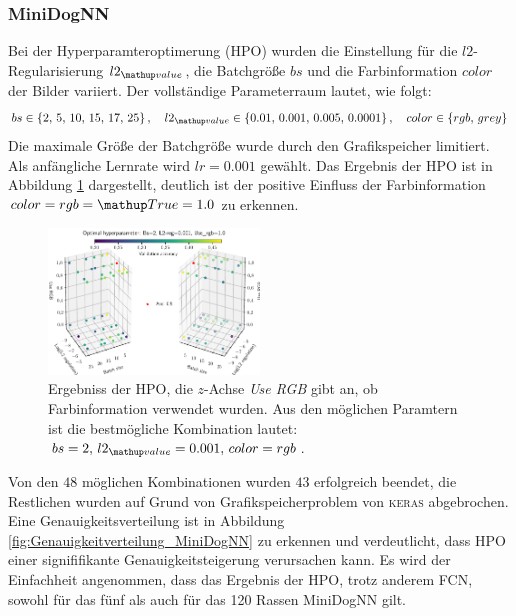 \subsubsection{MiniDogNN}
Bei der Hyperparamteroptimerung (HPO) wurden die Einstellung für die $l2$-Regularisierung $l2\ua{value}$,
die Batchgröße $bs$ und die Farbinformation $color$ der Bilder variiert. Der vollständige
Parameterraum lautet, wie folgt:
\begin{equation}
  \label{eq:Parameterraum_MiniDogNN}
  bs\in\left\{2,\, 5, \,10, \,15,\, 17,\, 25\right\}, \quad l2\ua{value}\in\left\{0.01, \,0.001,\, 0.005,\, 0.0001\right\}, \quad color\in\left\{rgb, \,grey\right\}
\end{equation}
Die maximale Größe der Batchgröße wurde durch den Grafikspeicher limitiert.
Als anfängliche Lernrate wird $lr=0.001$ gewählt.
Das Ergebnis der HPO ist in Abbildung \ref{fig:Hyperraum_MiniDogNN} dargestellt,
deutlich ist der positive Einfluss der Farbinformation $color=rgb=\map{True}=1.0$
zu erkennen.
\begin{figure}
\centering
\includegraphics[width=0.5\textwidth]{../../final_data/MiniNN_n5/hyper_raum.pdf}
\caption{Ergebniss der HPO, die $z$-Achse \emph{Use RGB} gibt an, ob Farbinformation
          verwendet wurden. Aus den möglichen Paramtern ist die bestmögliche Kombination
         lautet: $bs=2, \, l2\ua{value}=0.001, \, color=rgb$.}
\label{fig:Hyperraum_MiniDogNN}
\end{figure}
Von den $48$ möglichen Kombinationen wurden $43$ erfolgreich beendet, die Restlichen
wurden auf Grund von Grafikspeicherproblem von \textsc{keras} abgebrochen. Eine
Genauigkeitsverteilung ist in Abbildung \ref{fig:Genauigkeitverteilung_MiniDogNN} zu erkennen und verdeutlicht,
dass HPO einer signififikante Genauigkeitsteigerung verursachen kann.
Es wird der Einfachheit angenommen, dass das Ergebnis der HPO, trotz anderem
FCN, sowohl für das fünf als auch für das 120 Rassen MiniDogNN gilt.

